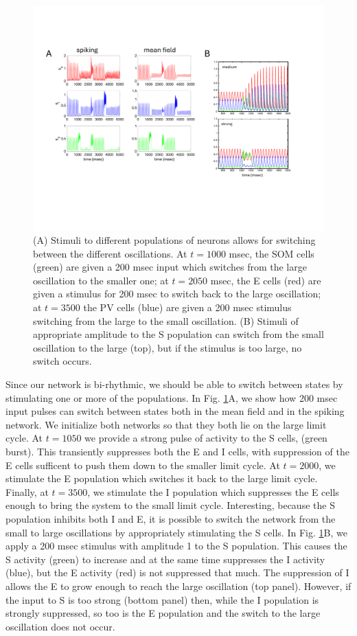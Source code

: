 \documentclass[10pt,letterpaper]{article}
\begin{document}
\begin{figure}
\includegraphics[width=.9\textwidth]{afig4.pdf}
\caption{(A) Stimuli to different populations of neurons allows for switching between the different oscillations. At $t=1000$ msec, the SOM cells (green) are given a 200 msec input which switches from the large oscillation to the smaller one; at $t=2050$ msec, the E cells (red) are given a stimulus for 200 msec to switch back to the large oscillation; at $t=3500$ the PV cells (blue) are given a 200 msec stimulus switching from the large to the small oscillation. (B) Stimuli of appropriate amplitude to the S population can switch from the small oscillation to the large (top), but if the stimulus is too large, no switch occurs.}
\label{fig:3}
\end{figure}


Since our network is bi-rhythmic, we should be able to switch between states by stimulating one or more of the populations. In Fig. \ref{fig:3}A, we show how 200 msec input pulses can switch between states both in the mean field and in the spiking network.  We initialize both networks so that they both lie on the large limit cycle.  At $t=1050$ we provide a strong pulse of activity to the S cells, (green burst). This transiently suppresses both the E and I cells, with suppression of the E cells sufficent to push them down to the smaller limit cycle.  At $t=2000$, we stimulate the E population which switches it back to the large limit cycle. Finally, at $t=3500$, we stimulate the I population which suppresses the E cells enough to bring the system to the small limit cycle.   Interesting, because the S population inhibits both I and E, it is possible to switch the network from the small to large oscillations by appropriately stimulating the S cells. In Fig. \ref{fig:3}B, we apply a 200 msec stimulus with amplitude 1 to the S population. This causes the S activity (green) to increase and at the same time suppresses the I activity (blue), but the E activity (red) is not suppressed that much. The suppression of I allows the E to grow enough to reach the large oscillation (top panel).  However, if the input to S is too strong (bottom panel) then, while the I population is strongly suppressed, so too is the E population and the switch to the large oscillation does not occur.
\end{document}
